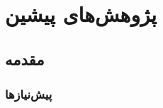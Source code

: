 \chapter{پژوهش‌های پیشین}\label{chap2}
\minitoc

\section{مقدمه}\label{intro}

\subsection{پیش‌نیازها}

